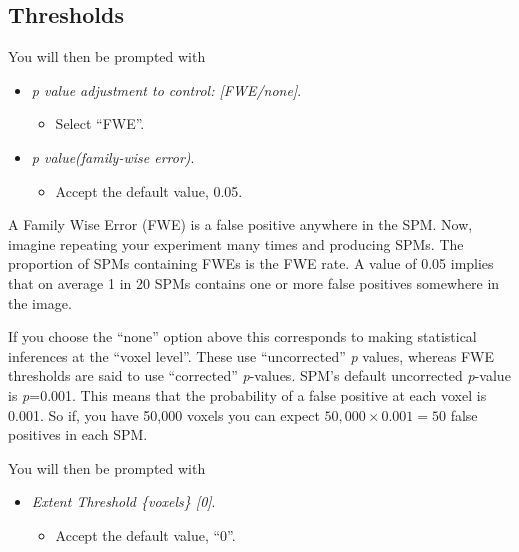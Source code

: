 \subsection{Thresholds}

You will then be prompted with

\begin{itemize}
\item \emph{p value adjustment to control: [FWE/none]}.
\begin{itemize}
\item Select ``FWE''.
\end{itemize}
\item \emph{p value(family-wise error)}.
\begin{itemize}
\item Accept the default value, 0.05.
\end{itemize}
\end{itemize}

A Family Wise Error (FWE) is a false positive anywhere in the SPM. Now, imagine repeating your experiment many times and producing SPMs. The proportion of SPMs containing FWEs is the FWE rate. A value of 0.05 implies that on average 1 in 20 SPMs contains one or more false positives somewhere in the image. 

If you choose the ``none'' option above this corresponds to making statistical inferences at the ``voxel level''. These use ``uncorrected'' \textit{p} values, whereas FWE thresholds are said to use ``corrected'' \textit{p}-values. SPM's default uncorrected \textit{p}-value is \textit{p}=0.001. This means that the probability of a false positive at each voxel is 0.001. So if, you have 50,000 voxels you can expect $50,000 \times 0.001 = 50$ false positives in each SPM.


You will then be prompted with

\begin{itemize}
\item \emph{Extent Threshold \{voxels\} [0]}.
\begin{itemize}
\item Accept the default value, ``0''.
\end{itemize}
\end{itemize}

